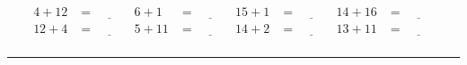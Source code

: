\documentclass{article}
\begin{document}
\begin{sloppy}
\begin{align*}
    {4} + {12} &= \underline{\hspace{1cm}} & {6} + {1} &= \underline{\hspace{1cm}} & {15} + {1} &= \underline{\hspace{1cm}} & {14} + {16} &= \underline{\hspace{1cm}} \\
    {12} + {4} &= \underline{\hspace{1cm}} & {5} + {11} &= \underline{\hspace{1cm}} & {14} + {2} &= \underline{\hspace{1cm}} & {13} + {11} &= \underline{\hspace{1cm}} \\
\end{align*}
\hrule
\end{sloppy}
\end{document}
